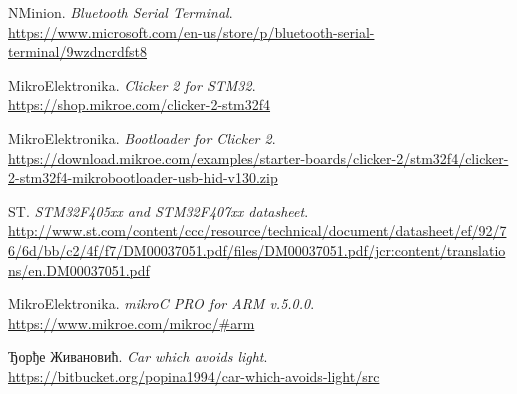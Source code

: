 


\begin{thebibliography}{15}
		NMinion.
		\emph{Bluetooth Serial Terminal}.\\
		\url{https://www.microsoft.com/en-us/store/p/bluetooth-serial-terminal/9wzdncrdfst8}
		
		MikroElektronika.
		\emph{Clicker 2 for STM32}.\\
		\url{https://shop.mikroe.com/clicker-2-stm32f4}
	
		MikroElektronika.
		\emph{Bootloader for Clicker 2}.\\
		\url{https://download.mikroe.com/examples/starter-boards/clicker-2/stm32f4/clicker-2-stm32f4-mikrobootloader-usb-hid-v130.zip}	
	
		ST.
		\emph{STM32F405xx and STM32F407xx datasheet}.\\
		\url{http://www.st.com/content/ccc/resource/technical/document/datasheet/ef/92/76/6d/bb/c2/4f/f7/DM00037051.pdf/files/DM00037051.pdf/jcr:content/translations/en.DM00037051.pdf}
		
		MikroElektronika.
		\emph{mikroC PRO for ARM v.5.0.0}.\\
		 \url{https://www.mikroe.com/mikroc/#arm}
		 
		 Ђорђе Живановић.
		\emph{Car which avoids light}.\\
		\url{https://bitbucket.org/popina1994/car-which-avoids-light/src}

\end{thebibliography}